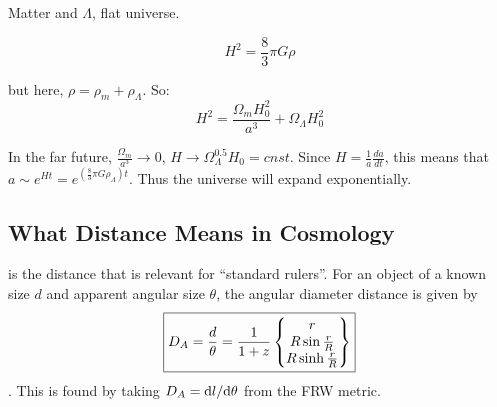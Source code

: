 Matter and $\Lambda$, flat universe.

\begin{equation}
H^2 = \frac{8}{3}\pi G\rho
\end{equation}

but here, $\rho = \rho_m + \rho_\Lambda$.  So:
\begin{equation}
H^2 = \frac{\Omega_mH_0^2}{a^3} + \Omega_\Lambda H_0^2
\end{equation}

In the far future, $\frac{\Omega_m}{a^3} \rightarrow 0$, $H \rightarrow \Omega_\Lambda^{0.5}H_0  = cnst$.  Since $H = \frac{1}{a}\frac{da}{dt}$, this means that $a \sim e^{Ht} = e^{\left(\frac{8}{3}\pi G\rho_\Lambda \right)t}$.  Thus the universe will expand exponentially.






\subsection{What Distance Means in Cosmology}
 is the distance that is relevant for
``standard rulers''.  For an object of a known size $d$ and apparent angular size $\theta$,
the angular diameter distance is given by
\begin{dmath}\boxed{
    D_A = \frac{d}{\theta} \nolinebreak = \frac{1}{1+z} \left\{\begin{matrix}
                r \\ R\sin\frac{r}{R} \\ R\sinh\frac{r}{R} \\
            \end{matrix}\right\}
}\end{dmath}.
This is found by taking $D_A = {\rm d} l/{\rm d}\theta$ from the FRW metric.

